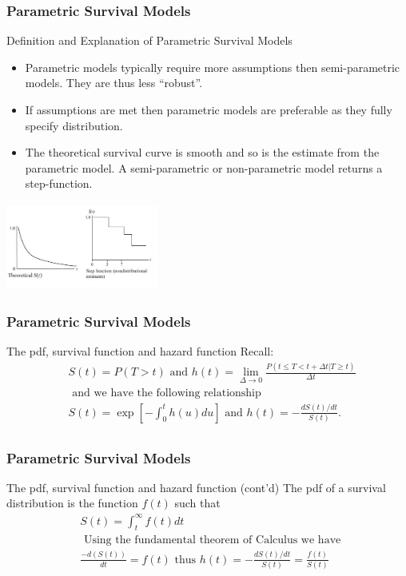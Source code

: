 \documentclass{beamer}
\theoremstyle{definition}
\begin{document}
\begin{frame}
\frametitle{Parametric Survival Models}
\begin{block}{Definition and Explanation of Parametric Survival Models}
\begin{itemize}
\item Parametric models typically require more assumptions then semi-parametric models. They are thus less ``robust''.
\item If assumptions are met then parametric models are preferable as they fully specify distribution.
\item The theoretical survival curve is smooth and so is the estimate from the parametric model. A semi-parametric or non-parametric model returns a step-function.
\end{itemize}
\vspace{-5pt}
\begin{center}
        \includegraphics[width=5cm, height=2.9cm]{CH7_pcurves.JPG}
    \end{center}
\end{block}
\end{frame}

\begin{frame}
\frametitle{Parametric Survival Models}
\begin{block}{The pdf, survival function and hazard function} 
Recall: 
\begin{align*} 
& S(t) = P(T>t) \text{ and } h(t) = \lim_{\Delta \rightarrow 0} \frac{P(t \le T < t + \Delta t | T \ge t)}{\Delta t} \\
& \text{ and we have the following relationship} \\ 
& S(t) = \exp\left[-\int_0^t h(u) du\right] \text{ and } h(t) = -\frac{d S(t)/dt}{S(t)}. \\
\end{align*} 
\end{block} 
\end{frame} 

\begin{frame}
\frametitle{Parametric Survival Models}
\begin{block}{The pdf, survival function and hazard function (cont'd)}
The pdf of a survival distribution is the function $f(t)$ such that 
\begin{align*}
& S(t) = \int_t^\infty f(t) dt \\
& \text{ Using the fundamental theorem of Calculus we have } \\
& \frac{-d(S(t))}{dt} = f(t) \text{ thus } h(t) = -\frac{d S(t)/dt}{S(t)} = \frac{f(t)}{S(t)} \\
\end{align*}
\end{block}
\end{frame}
\end{document}
